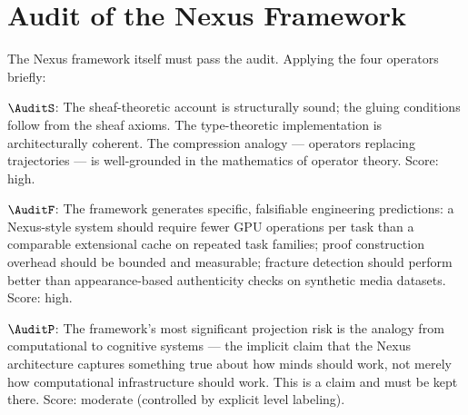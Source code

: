 



\section{Audit of the Nexus Framework}
\label{sec:nexus-audit}

The Nexus framework itself must pass the \Ortyx{}
audit. Applying the four operators briefly:

$\AuditS$: The sheaf-theoretic account is structurally
sound; the gluing conditions follow from the sheaf
axioms. The type-theoretic implementation is
architecturally coherent. The compression analogy ---
operators replacing trajectories --- is well-grounded
in the mathematics of operator theory. Score: high.

$\AuditF$: The framework generates specific, falsifiable
engineering predictions: a Nexus-style system should
require fewer GPU operations per task than a comparable
extensional cache on repeated task families; proof
construction overhead should be bounded and measurable;
fracture detection should perform better than
appearance-based authenticity checks on synthetic media
datasets. Score: high.

$\AuditP$: The framework's most significant projection
risk is the analogy from computational to cognitive
systems --- the implicit claim that the Nexus architecture
captures something true about how minds should work,
not merely how computational infrastructure should
work. This is a \LevelII{} claim and must be kept there.
Score: moderate (controlled by explicit level labeling).

